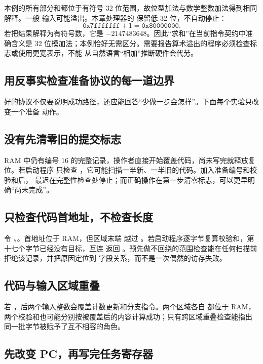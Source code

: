 本例的所有部分和都位于有符号 32 位范围，故位型加法与数学整数加法得到相同解释。一般
输入可能溢出。本章处理器的  保留低 32 位，不自动停止：
\[
\texttt{0x7fffffff}+1=\texttt{0x80000000}.
\]
若把结果解释为有符号数，它是 \(-2147483648\)。因此“求和”在当前指令契约中准确含义是
32 位模加法；本例恰好无需区分。需要报告算术溢出的程序必须检查标志或使用更宽表示，不能
从自然语言“相加”推断硬件会代劳。

\subsection{用反事实检查准备协议的每一道边界}

好的协议不仅要说明成功路径，还应能回答“少做一步会怎样”。下面每个实验只改变一个准备
动作。

\subsection{没有先清零旧的提交标志}

RAM 中仍有编号 16 的完整记录，操作者直接开始覆盖代码，尚未写完就释放复位。若启动程序
只检查 ，它可能扫描一半新、一半旧的代码。加入准备编号和校验和后，
最迟在完整性检查处停止；而正确操作在第一步清零标志，可以更早明确“尚未完成”。

\subsection{只检查代码首地址，不检查长度}

令 、。首地址位于 RAM，但区域末端
越过 。若启动程序逐字节复算校验和，第十七个字节已经没有目标，互连
返回 。预先做不回绕的范围检查能在任何扫描前拒绝该记录，并把原因定位到
字段关系，而不是一次偶然的访存失败。

\subsection{代码与输入区域重叠}

若 ，后两个输入整数会覆盖计数更新和分支指令。两个区域各自
都位于 RAM，两个校验和也可能分别按被覆盖后的内容计算成功；只有跨区域重叠检查能指出
同一批字节被赋予了互不相容的角色。

\subsection{先改变 PC，再写完任务寄存器}

